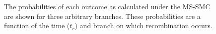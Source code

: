 \documentclass[11pt]{article}
\begin{document}
\begin{figure}
{		%
		The probabilities of each outcome as calculated under the MS-SMC 
		are shown for three arbitrary branches. These probabilities are a function of the time ($t_r$) and branch 
		on which recombination occurs.
	}
	\label{fig:fig1}
\end{figure}
\end{document}
